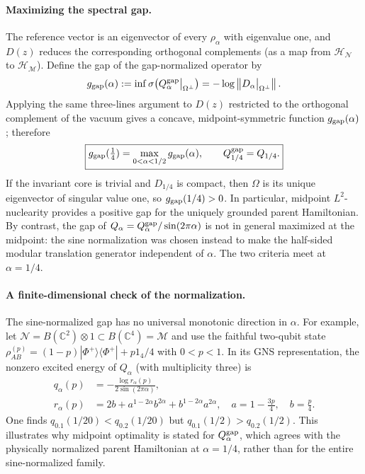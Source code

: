 \documentclass[a4paper,11pt]{article}
\theoremstyle{definition}
\newcommand{\nn}{\nonumber}
\newcommand{\mN}{\mathcal{N}}
\newcommand{\mH}{\mathcal{H}}
\newcommand{\mM}{\mathcal{M}}
\begin{document}
\paragraph{Maximizing the spectral gap.}
The reference vector is an eigenvector of every $\rho_\alpha$
with eigenvalue one, and $D(z)$ reduces the corresponding
orthogonal complements (as a map from $\mH_\mN$ to $\mH_\mM$).
Define the gap of the gap-normalized operator by
\begin{equation}
 g_{\rm gap}(\alpha)
 :=\inf\sigma\!\left(
 Q_\alpha^{\rm gap}\big|_{\Omega^\perp}\right)
 =-\log\left\|
 D_\alpha\big|_{\Omega^\perp}\right\|.
 \label{eq:Q-midpoint-gap}
\end{equation}
Applying the same three-lines argument to $D(z)$ restricted
to the orthogonal complement of the vacuum gives a concave,
midpoint-symmetric function $g_{\rm gap}(\alpha)$; therefore
\begin{equation}
 \boxed{
 g_{\rm gap}(\tfrac14)
 =\max_{0<\alpha<1/2}g_{\rm gap}(\alpha),
 \qquad Q_{1/4}^{\rm gap}=Q_{1/4}.}
 \label{eq:Q-gap-optimal-midpoint}
\end{equation}
If the invariant core is trivial and $D_{1/4}$ is compact,
then $\Omega$ is its unique eigenvector of singular value one,
so $g_{\rm gap}(1/4)>0$. In particular, midpoint
$L^2$-nuclearity provides a positive gap for the uniquely grounded
parent Hamiltonian. By contrast, the gap of
$Q_\alpha=Q_\alpha^{\rm gap}/\sin(2\pi\alpha)$ is not
in general maximized at the midpoint: the sine normalization was
chosen instead to make the half-sided modular translation generator
independent of $\alpha$. The two criteria meet at $\alpha=1/4$.

\paragraph{A finite-dimensional check of the normalization.}
The sine-normalized gap has no universal monotonic direction in
$\alpha$. For example, let
$\mN=B(\mathbb C^2)\otimes1\subset B(\mathbb C^4)=\mM$
and use the faithful two-qubit state
$\rho_{AB}^{(p)}=(1-p)|\Phi^+\rangle\langle\Phi^+|+p1_4/4$
with $0<p<1$. In its GNS representation, the nonzero excited
energy of $Q_\alpha$ (with multiplicity three) is
\begin{align}
 q_\alpha(p)&=-\frac{\log r_\alpha(p)}{2\sin(2\pi\alpha)},\nn\\
 r_\alpha(p)&=2b+a^{1-2\alpha}b^{2\alpha}
                   +b^{1-2\alpha}a^{2\alpha},
 \quad a=1-\frac{3p}{4},\quad b=\frac p4.
 \label{eq:Q-alpha-two-qubit-counterexample}
\end{align}
One finds $q_{0.1}(1/20)<q_{0.2}(1/20)$ but
$q_{0.1}(1/2)>q_{0.2}(1/2)$. This illustrates why midpoint
optimality is stated for $Q_\alpha^{\rm gap}$, which agrees
with the physically normalized parent Hamiltonian at $\alpha=1/4$,
rather than for the entire sine-normalized family.
\end{document}
